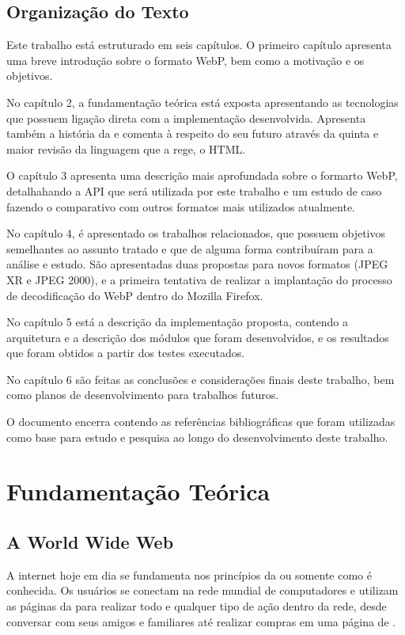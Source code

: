 \documentclass[espaco=simples,appendix=Name]{abnt}
\begin{document}
\section{Organização do Texto}

Este trabalho está estruturado em seis capítulos. O primeiro capítulo apresenta uma breve introdução sobre o formato WebP, bem como a motivação e os objetivos. 

No capítulo 2, a fundamentação teórica está exposta apresentando as tecnologias que possuem ligação direta com a implementação desenvolvida. Apresenta também a história da  e comenta à respeito do seu futuro através da quinta e maior revisão da linguagem que a rege, o HTML. 

O capítulo 3 apresenta uma descrição mais aprofundada sobre o formarto WebP, detalhahando a API que será utilizada por este trabalho e um estudo de caso fazendo o comparativo com outros formatos mais utilizados atualmente.

No capítulo 4, é apresentado os trabalhos relacionados, que possuem objetivos semelhantes ao assunto tratado e que de alguma forma contribuíram para a análise e estudo. São apresentadas duas propostas para novos formatos (JPEG XR e JPEG 2000), e a primeira tentativa de realizar a implantação do processo de decodificação do WebP dentro do Mozilla Firefox. 

No capítulo 5 está a descrição da implementação proposta, contendo a arquitetura e a descrição dos módulos que foram desenvolvidos, e os resultados que foram obtidos a partir dos testes executados. 

No capítulo 6 são feitas as conclusões e considerações finais deste trabalho, bem como planos de desenvolvimento para trabalhos futuros. 

O documento encerra contendo as referências bibliográficas que foram utilizadas como base para estudo e pesquisa ao longo do desenvolvimento deste trabalho.

\chapter{Fundamentação Teórica}

\section{A World Wide Web}

A internet hoje em dia se fundamenta nos princípios da  ou somente  como é conhecida. Os usuários se conectam na rede mundial de computadores e utilizam as páginas da  para realizar todo e qualquer tipo de ação dentro da rede, desde conversar com seus amigos e familiares até realizar compras em uma página de .
\end{document}
